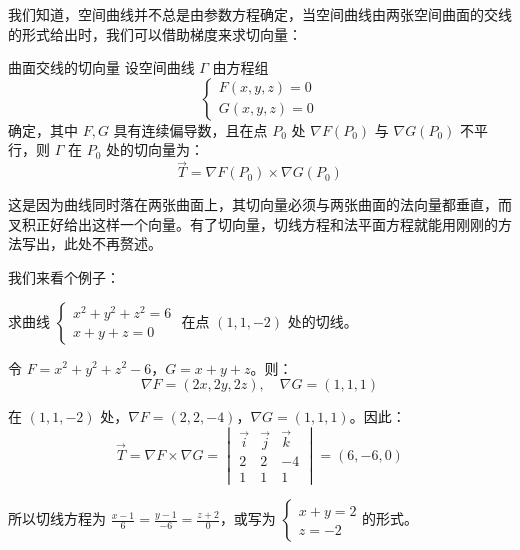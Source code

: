 \begin{myexample}
\begin{center}
\end{center}

\end{myexample}

我们知道，空间曲线并不总是由参数方程确定，当空间曲线由两张空间曲面的交线的形式给出时，我们可以借助梯度来求切向量：

\begin{theorem}{曲面交线的切向量}{}
设空间曲线 $\Gamma$ 由方程组
\[
\begin{cases}
F(x,y,z) = 0 \\
G(x,y,z) = 0
\end{cases}
\]
确定，其中 $F,G$ 具有连续偏导数，且在点 $P_0$ 处 $\nabla F(P_0)$ 与 $\nabla G(P_0)$ 不平行，则 $\Gamma$ 在 $P_0$ 处的切向量为：
\[
\vec{T} = \nabla F(P_0) \times \nabla G(P_0)
\]
\end{theorem}

这是因为曲线同时落在两张曲面上，其切向量必须与两张曲面的法向量都垂直，而叉积正好给出这样一个向量。有了切向量，切线方程和法平面方程就能用刚刚的方法写出，此处不再赘述。

我们来看个例子：

\begin{myexample}
求曲线 $\begin{cases} x^2+y^2+z^2=6 \\ x+y+z=0 \end{cases}$ 在点 $(1,1,-2)$ 处的切线。

令 $F=x^2+y^2+z^2-6$，$G=x+y+z$。则：
\[
\nabla F = (2x,2y,2z),\quad \nabla G = (1,1,1)
\]

在 $(1,1,-2)$ 处，$\nabla F = (2,2,-4)$，$\nabla G = (1,1,1)$。因此：
\[
\vec{T} = \nabla F \times \nabla G =
\begin{vmatrix}
\vec{i} & \vec{j} & \vec{k} \\
2 & 2 & -4 \\
1 & 1 & 1
\end{vmatrix}
= (6, -6, 0)
\]

所以切线方程为 $\frac{x-1}{6} = \frac{y-1}{-6} = \frac{z+2}{0}$，或写为 $\begin{cases} x+y=2 \\ z = -2 \end{cases}$的形式。
\end{myexample}

